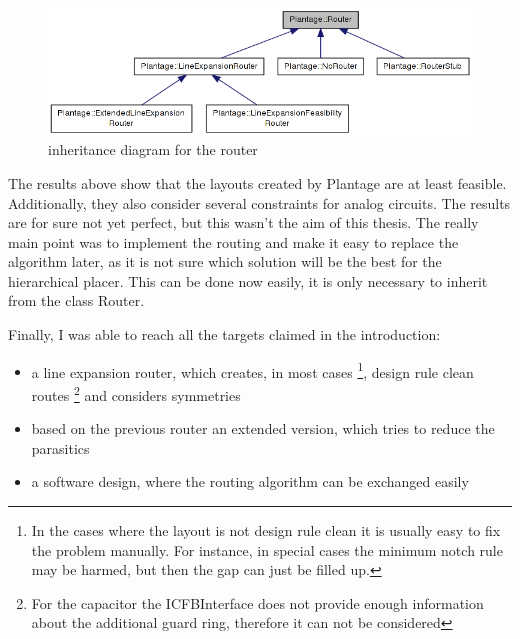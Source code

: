 \begin{figure}
	\centering
	\includegraphics[scale=.6]{FIG/class_diagram_router.png}
  	\caption{inheritance diagram for the router}
	\label{fig:class_diagram_router}
\end{figure}

The results above show that the layouts created by Plantage are at least feasible. Additionally, they also consider several constraints for analog circuits. The results are for sure not yet perfect, but this wasn't the aim of this thesis. The really main point was to implement the routing and make it easy to replace the algorithm later, as it is not sure which solution will be the best for the hierarchical placer. This can be done now easily, it is only necessary to inherit from the class Router.

\begin{samepage}
Finally, I was able to reach all the targets claimed in the introduction:
\begin{itemize}
\item a line expansion router, which creates, in most cases \footnote{In the cases where the layout is not design rule clean it is usually easy to fix the problem manually. For instance, in special cases the minimum notch rule may be harmed, but then the gap can just be filled up.}, design rule clean routes \footnote{For the capacitor the ICFBInterface does not provide enough information about the additional guard ring, therefore it can not be considered} and considers symmetries
\item based on the previous router an extended version, which tries to reduce the parasitics
\item a software design, where the routing algorithm can be exchanged easily
\end{itemize}
\end{samepage}

